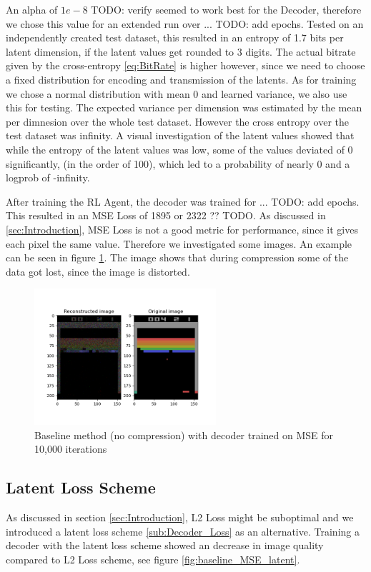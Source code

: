 An alpha of $1e-8$ TODO: verify seemed to work best for the Decoder, therefore
we chose this value for an extended run over ... TODO: add epochs. Tested on an
independently created test dataset, this resulted in an entropy of 1.7 bits per
latent dimension, if the latent values get rounded to 3 digits. The actual
bitrate given by the cross-entropy \ref{eq:BitRate} is higher however, since
we need to choose a fixed distribution for encoding and transmission of the
latents. As for training we chose a normal distribution with mean 0 and learned
variance, we also use this for testing. The expected variance per dimension was
estimated by the mean per dimnesion over the whole test dataset. However the
cross entropy over the test dataset was infinity. A visual investigation of the
latent values showed that while the entropy of the latent values was low, some
of the values deviated of 0 significantly, (in the order of 100), which led to a
probability of nearly 0 and a logprob of -infinity.

After training the RL Agent, the decoder was trained for ... TODO: add epochs.
This resulted in an MSE Loss of 1895 or 2322 ?? TODO. As discussed in
\ref{sec:Introduction}, MSE Loss is not a good metric for performance, since it
gives each pixel the same value. Therefore we investigated some images. An
example can be seen in figure \ref{fig:final_agent}. The image shows that during
compression some of the data got lost, since the image is distorted.
\begin{figure}[H]
    \centering
    \includegraphics[width=0.6\textwidth]{images/orig_reconstructed_final_agent.png}
    \caption{Baseline method (no compression) with decoder trained on MSE for 10,000 iterations}
    \label{fig:final_agent}
\end{figure}

\subsection{Latent Loss Scheme}
As discussed in section \ref{sec:Introduction}, L2 Loss might be suboptimal and
we introduced a latent loss scheme \ref{sub:Decoder_Loss} as an alternative.
Training a decoder with the latent loss scheme showed an decrease in image
quality compared to L2 Loss scheme, see figure \ref{fig:baseline_MSE_latent}.

